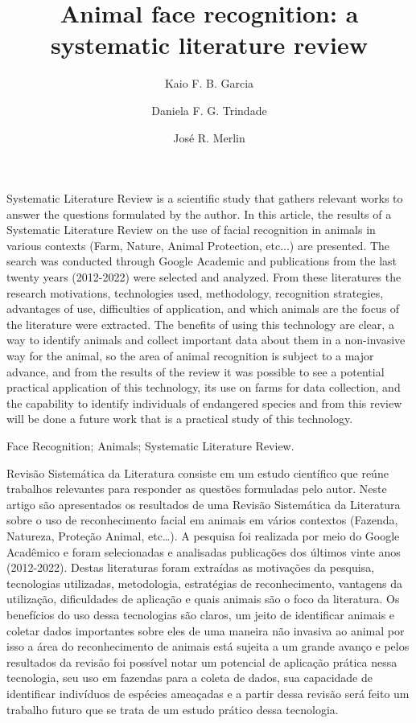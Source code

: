 \documentclass[alpha-refs,english]{RBCA_v3.0}
\title{Animal face recognition: a systematic literature review}
\author[1]{Kaio F. B. Garcia}
\author[1]{Daniela F. G. Trindade\orcid{0000-0003-4428-3295}}
\author[1]{José R. Merlin\orcid{0000-0002-9944-0537}}
\affil[1]{UENP - Universidade Estadual do Norte do Paraná}
\begin{document}
\begin{frontmatter}
	
\maketitle
\thispagestyle{empty}

\begin{Abstract} %
Systematic Literature Review is a scientific study that gathers relevant works to answer the questions formulated by the author. In this article, the results of a Systematic Literature Review on the use of facial recognition in animals in various contexts (Farm, Nature, Animal Protection, etc...) are presented. The search was conducted through Google Academic and publications from the last twenty years (2012-2022) were selected and analyzed. From these literatures the research motivations, technologies used, methodology, recognition strategies, advantages of use, difficulties of application, and which animals are the focus of the literature were extracted. The benefits of using this technology are clear, a way to identify animals and collect important data about them in a non-invasive way for the animal, so the area of animal recognition is subject to a major advance, and from the results of the review it was possible to see a potential practical application of this technology, its use on farms for data collection, and the capability to identify individuals of endangered species and from this review will be done a future work that is a practical study of this technology.
\end{Abstract}

\begin{keywords}
Face Recognition; Animals; Systematic Literature Review.
\end{keywords}

\begin{resumo} %
	Revisão Sistemática da Literatura consiste em um estudo científico que reúne trabalhos relevantes para responder as questões formuladas pelo autor. Neste artigo são apresentados os resultados de uma Revisão Sistemática da Literatura sobre o uso de reconhecimento facial em animais em vários contextos (Fazenda, Natureza, Proteção Animal, etc…). A pesquisa foi realizada por meio do Google Acadêmico e foram selecionadas e analisadas publicações dos últimos vinte anos (2012-2022). Destas literaturas foram extraídas as motivações da pesquisa, tecnologias utilizadas, metodologia, estratégias de reconhecimento, vantagens da utilização, dificuldades de aplicação e quais animais são o foco da literatura. Os benefícios do uso dessa tecnologias são claros, um jeito de identificar animais e coletar dados importantes sobre eles de uma maneira não invasiva ao animal por isso a área do reconhecimento de animais está sujeita a um grande avanço e pelos resultados da revisão foi possível notar um potencial de aplicação prática nessa tecnologia, seu uso em fazendas para a coleta de dados, sua capacidade de identificar indivíduos de espécies ameaçadas e a partir dessa revisão será feito um trabalho futuro que se trata de um estudo prático dessa tecnologia.
\end{resumo}


\end{frontmatter}
\end{document}
